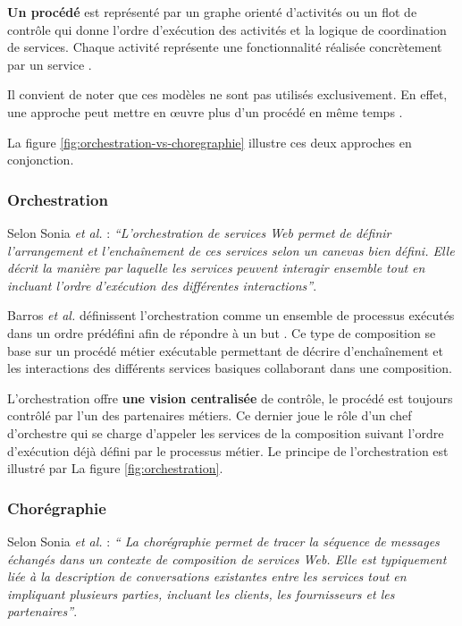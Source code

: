   \textbf{Un procédé} est représenté par un graphe orienté d'activités
  ou un flot de contrôle qui donne l'ordre d'exécution des activités
  et la logique de coordination de services. Chaque activité
  représente une fonctionnalité réalisée concrètement par un service
  \cite{chollet2009orchestration}.\medskip

  Il convient de noter que ces modèles ne sont pas utilisés
  exclusivement. En effet, une approche peut mettre en œuvre plus d'un
  procédé en même temps \cite{baryannis2010}.\medskip

  \newpage
  La figure \ref{fig:orchestration-vs-choregraphie} illustre ces deux
  approches en conjonction.

  

    \subsubsection{Orchestration}
    \label{sec:orchestration}
    Selon Sonia \emph{et al.} \cite{jamal2005environnement}:
    \emph{``L'orchestration de services Web permet de définir
      l'arrangement et l'enchaînement de ces services selon un
      canevas bien défini. Elle décrit la manière par laquelle les
      services peuvent interagir ensemble tout en incluant l'ordre
      d'exécution des différentes interactions''}.\bigskip

    Barros \emph{et al.} \cite{barros2006standards} définissent
    l'orchestration comme un ensemble de processus exécutés dans un
    ordre prédéfini afin de répondre à un but
    \cite{lopez2008selection}. Ce type de composition se base sur un
    procédé métier exécutable permettant de décrire d'enchaînement et
    les interactions des différents services basiques collaborant dans
    une composition.\medskip

    L'orchestration offre \textbf{une vision centralisée} de contrôle,
    le procédé est toujours contrôlé par l'un des partenaires
    métiers. Ce dernier joue le rôle d'un chef d'orchestre qui se
    charge d'appeler les services de la composition suivant l'ordre
    d'exécution déjà défini par le processus métier. Le principe de
    l'orchestration est illustré par La figure
    \ref{fig:orchestration}.

    \subsubsection{Chorégraphie}
    \label{sec:choregraphie-sec}
    Selon Sonia \emph{et al.} \cite{jamal2005environnement} : \emph{``
      La chorégraphie permet de tracer la séquence de messages
      échangés dans un contexte de composition de services Web. Elle
      est typiquement liée à la description de conversations
      existantes entre les services tout en impliquant plusieurs
      parties, incluant les clients, les fournisseurs et les
      partenaires''}.\bigskip

